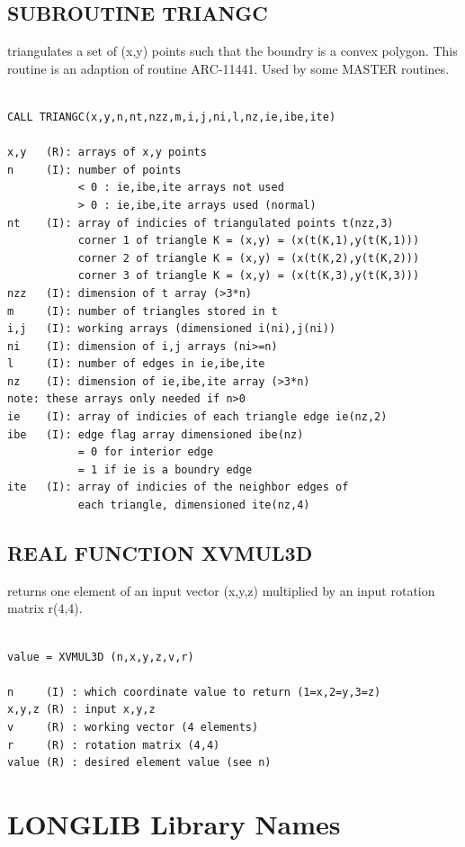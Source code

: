 \documentclass[11pt]{report}
\begin{document}
\section{SUBROUTINE TRIANGC}

 triangulates a set of (x,y) points such that the boundry is a
convex polygon.  This routine is an adaption of  routine ARC-11441.
Used by some MASTER routines.
\begin{verbatim}

CALL TRIANGC(x,y,n,nt,nzz,m,i,j,ni,l,nz,ie,ibe,ite)

x,y   (R): arrays of x,y points
n     (I): number of points
           < 0 : ie,ibe,ite arrays not used
           > 0 : ie,ibe,ite arrays used (normal)
nt    (I): array of indicies of triangulated points t(nzz,3)
           corner 1 of triangle K = (x,y) = (x(t(K,1),y(t(K,1)))
           corner 2 of triangle K = (x,y) = (x(t(K,2),y(t(K,2)))
           corner 3 of triangle K = (x,y) = (x(t(K,3),y(t(K,3)))
nzz   (I): dimension of t array (>3*n)
m     (I): number of triangles stored in t
i,j   (I): working arrays (dimensioned i(ni),j(ni))
ni    (I): dimension of i,j arrays (ni>=n)
l     (I): number of edges in ie,ibe,ite
nz    (I): dimension of ie,ibe,ite array (>3*n)
note: these arrays only needed if n>0
ie    (I): array of indicies of each triangle edge ie(nz,2)
ibe   (I): edge flag array dimensioned ibe(nz)
           = 0 for interior edge
           = 1 if ie is a boundry edge
ite   (I): array of indicies of the neighbor edges of
           each triangle, dimensioned ite(nz,4)
\end{verbatim}

\section{REAL FUNCTION XVMUL3D}

 returns one element of an input vector (x,y,z) multiplied by an input
rotation matrix r(4,4).
\begin{verbatim}

value = XVMUL3D (n,x,y,z,v,r)

n     (I) : which coordinate value to return (1=x,2=y,3=z)
x,y,z (R) : input x,y,z
v     (R) : working vector (4 elements)
r     (R) : rotation matrix (4,4)
value (R) : desired element value (see n)
\end{verbatim}

\chapter{LONGLIB Library Names}
\end{document}
